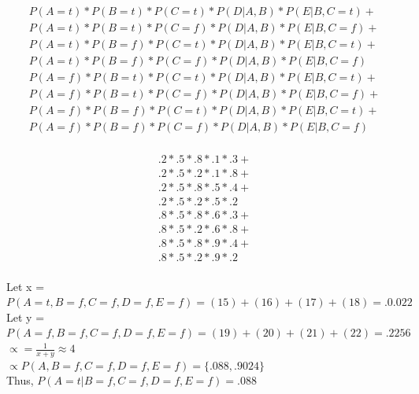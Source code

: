 \documentclass[12pt]{article}
\begin{document}
\begin{gather}
 P(A=t) * P(B=t)*P(C=t)*P(D| A, B)*P(E|B,C=t) + \\
 P(A=t) * P(B=t)*P(C=f)*P(D| A, B)*P(E|B,C=f)  + \\
 P(A=t) * P(B=f)*P(C=t)*P(D| A, B)*P(E|B,C=t)  + \\
 P(A=t) * P(B=f)*P(C=f)*P(D| A, B)*P(E|B,C=f)   \\
 P(A=f) * P(B=t)*P(C=t)*P(D| A, B)*P(E|B,C=t) + \\
 P(A=f) * P(B=t)*P(C=f)*P(D| A, B)*P(E|B,C=f) + \\
 P(A=f) * P(B=f)*P(C=t)*P(D| A, B)*P(E|B,C=t)  + \\
 P(A=f) * P(B=f)*P(C=f)*P(D| A, B)*P(E|B,C=f) 
\end{gather}\\
\begin{gather}
.2*.5*.8*.1*.3 + \\
.2*.5*.2*.1*.8 + \\
.2*.5*.8*.5*.4 + \\
.2*.5*.2*.5*.2 \\
.8*.5*.8*.6*.3 + \\
.8*.5*.2*.6*.8 + \\
.8*.5*.8*.9*.4 + \\
.8*.5*.2*.9*.2
\end{gather}\\
Let x = $P(A = t, B = f, C = f, D = f, E = f) = (15) + (16) + (17) + (18) = .0.022 $\\
Let y = $P(A = f, B = f, C = f, D = f, E = f) = (19) + (20) + (21) + (22) = .2256$\\
$\propto = \frac{1}{x+y} \approx 4$\\
$\propto P(A, B = f, C = f, D = f, E = f) = \{.088, .9024\}$ \\ 
Thus, $P(A = t | B = f, C = f, D = f, E = f) = .088 $\\ 
\newpage
\end{document}
